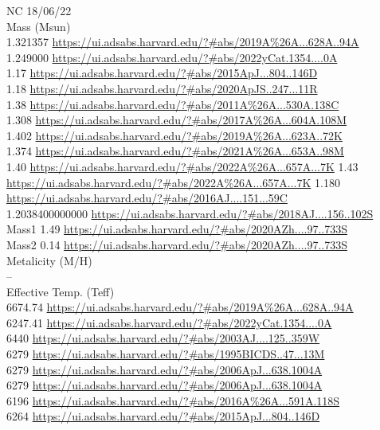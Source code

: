 NC 18/06/22\\

Mass (Msun)\\
1.321357 \url{https://ui.adsabs.harvard.edu/?#abs/2019A%26A...628A..94A}\\
1.249000 \url{https://ui.adsabs.harvard.edu/?#abs/2022yCat.1354....0A}\\
1.17 \url{https://ui.adsabs.harvard.edu/?#abs/2015ApJ...804..146D}\\
1.18 \url{https://ui.adsabs.harvard.edu/?#abs/2020ApJS..247...11R}\\
1.38 \url{https://ui.adsabs.harvard.edu/?#abs/2011A%26A...530A.138C}\\
1.308 \url{https://ui.adsabs.harvard.edu/?#abs/2017A%26A...604A.108M}\\
1.402 \url{https://ui.adsabs.harvard.edu/?#abs/2019A%26A...623A..72K}\\
1.374 \url{https://ui.adsabs.harvard.edu/?#abs/2021A%26A...653A..98M}\\
1.40 \url{https://ui.adsabs.harvard.edu/?#abs/2022A%26A...657A...7K}
1.43 \url{https://ui.adsabs.harvard.edu/?#abs/2022A%26A...657A...7K}
1.180 \url{https://ui.adsabs.harvard.edu/?#abs/2016AJ....151...59C}\\
1.2038400000000 \url{https://ui.adsabs.harvard.edu/?#abs/2018AJ....156..102S}\\
Mass1 1.49 \url{https://ui.adsabs.harvard.edu/?#abs/2020AZh....97..733S}\\
Mass2 0.14 \url{https://ui.adsabs.harvard.edu/?#abs/2020AZh....97..733S}\\
Metalicity (M/H)\\ 
--\\
Effective Temp. (Teff)\\
6674.74 \url{https://ui.adsabs.harvard.edu/?#abs/2019A%26A...628A..94A}\\
6247.41 \url{https://ui.adsabs.harvard.edu/?#abs/2022yCat.1354....0A}\\
6440 \url{https://ui.adsabs.harvard.edu/?#abs/2003AJ....125..359W}\\
6279 \url{https://ui.adsabs.harvard.edu/?#abs/1995BICDS..47...13M}\\
6279 \url{https://ui.adsabs.harvard.edu/?#abs/2006ApJ...638.1004A}\\
6279 \url{https://ui.adsabs.harvard.edu/?#abs/2006ApJ...638.1004A}\\
6196 \url{https://ui.adsabs.harvard.edu/?#abs/2016A%26A...591A.118S}\\
6264 \url{https://ui.adsabs.harvard.edu/?#abs/2015ApJ...804..146D}\\
